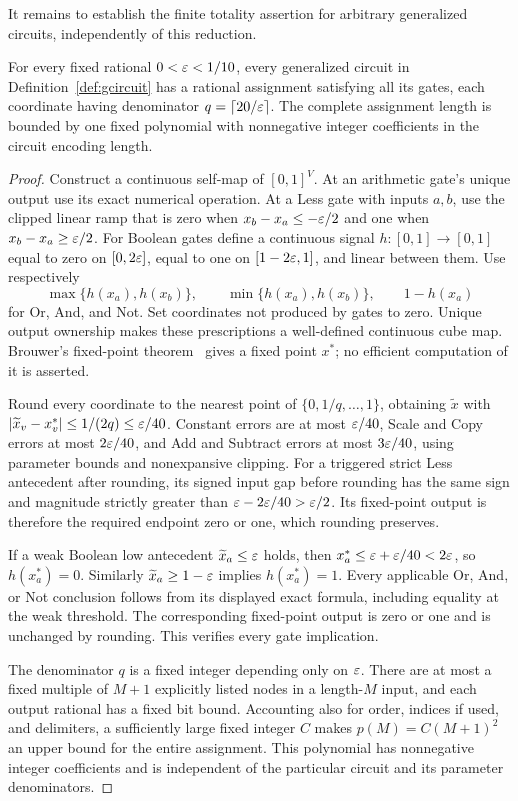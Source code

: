 It remains to establish the finite totality assertion for arbitrary
generalized circuits, independently of this reduction.

\begin{lemma}
\label{out:totality}
For every fixed rational $0<\varepsilon<1/10$, every generalized circuit in
Definition~\ref{def:gcircuit} has a rational assignment satisfying all
its gates, each coordinate having denominator
$q=\lceil20/\varepsilon\rceil$. The complete assignment length is bounded by
one fixed polynomial with nonnegative integer coefficients in the
circuit encoding length.
\end{lemma}
\begin{proof}
Construct a continuous self-map of $[0,1]^V$. At an arithmetic gate's
unique output use its exact numerical operation. At a Less gate with
inputs $a,b$, use the clipped linear ramp that is zero when
$x_b-x_a\leq-\varepsilon/2$ and one when
$x_b-x_a\geq\varepsilon/2$. For Boolean gates define a continuous signal
$h:[0,1]\to[0,1]$ equal to zero on $[0,2\varepsilon]$, equal to one on
$[1-2\varepsilon,1]$, and linear between them. Use respectively
\[
 \max\{h(x_a),h(x_b)\},\qquad
 \min\{h(x_a),h(x_b)\},\qquad 1-h(x_a)
\]
for Or, And, and Not. Set coordinates not produced by gates to zero.
Unique output ownership makes these prescriptions a well-defined
continuous cube map. Brouwer's fixed-point theorem~\cite{Brouwer1911} gives a fixed point
$x^*$; no efficient computation of it is asserted.

Round every coordinate to the nearest point of
$\{0,1/q,\ldots,1\}$, obtaining $\widetilde x$ with
$|\widetilde x_v-x_v^*|\leq1/(2q)\leq\varepsilon/40$.
Constant errors are at most $\varepsilon/40$, Scale and Copy errors at most
$2\varepsilon/40$, and Add and Subtract errors at most $3\varepsilon/40$, using
parameter bounds and nonexpansive clipping. For a triggered strict
Less antecedent after rounding, its signed input gap before rounding
has the same sign and magnitude strictly greater than
$\varepsilon-2\varepsilon/40>\varepsilon/2$. Its fixed-point output is therefore the
required endpoint zero or one, which rounding preserves.

If a weak Boolean low antecedent
$\widetilde x_a\leq\varepsilon$ holds, then
$x_a^*\leq\varepsilon+\varepsilon/40<2\varepsilon$, so $h(x_a^*)=0$.
Similarly $\widetilde x_a\geq1-\varepsilon$ implies
$h(x_a^*)=1$. Every applicable Or, And, or Not conclusion follows
from its displayed exact formula, including equality at the weak
threshold. The corresponding fixed-point output is zero or one and
is unchanged by rounding. This verifies every gate implication.

The denominator $q$ is a fixed integer depending only on $\varepsilon$.
There are at most a fixed multiple of $M+1$ explicitly listed nodes
in a length-$M$ input, and each output rational has a fixed bit bound.
Accounting also for order, indices if used, and delimiters, a
sufficiently large fixed integer $C$ makes
$p(M)=C(M+1)^2$ an upper bound for the entire assignment. This
polynomial has nonnegative integer coefficients and is independent of
the particular circuit and its parameter denominators.
\end{proof}


